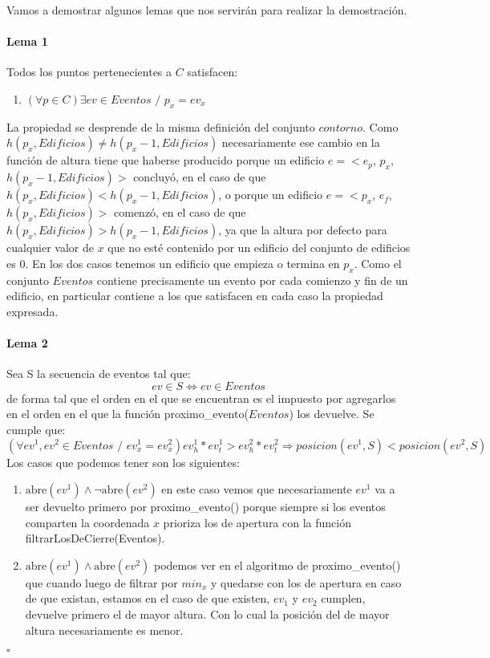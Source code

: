 Vamos a demostrar algunos lemas que nos servirán para realizar la demostración.

\paragraph{Lema 1}
Todos los puntos pertenecientes a $C$ satisfacen:
\begin{enumerate}
	\item $(\forall p \in C) \exists ev \in Eventos \text{ / } p_x = ev_x$
\end{enumerate}
La propiedad se desprende de la misma definición del conjunto $contorno$. Como $h(p_x, Edificios) \neq h(p_x - 1, Edificios)$ 
necesariamente ese cambio en la función de altura tiene que haberse producido porque un edificio 
$e = <e_p$, $p_x$, $h(p_x-1, Edificios)>$ concluyó, en el caso de que $h(p_x, Edificios) < h(p_x - 1, Edificios)$, o porque un
edificio $e = <p_x$, $e_f$, $h(p_x, Edificios)>$ comenzó, en el caso de que $h(p_x, Edificios) > h(p_x - 1, Edificios)$, ya que 
la altura por defecto para cualquier valor de $x$ que no esté contenido por un edificio del conjunto de edificios es 0. En los dos
casos tenemos un edificio que empieza o termina en $p_x$. Como el conjunto $Eventos$ contiene precisamente un evento por cada comienzo
y fin de un edificio, en particular contiene a los que satisfacen en cada caso la propiedad expresada.

\paragraph{Lema 2}
Sea S la secuencia de eventos tal que:
\begin{displaymath}
	ev \in S \Leftrightarrow ev \in Eventos
\end{displaymath}
de forma tal que el orden en el que se encuentran es el impuesto por agregarlos en el orden en el que la función 
proximo\_evento($Eventos$) los devuelve. Se cumple que:
\begin{displaymath}
	(\forall ev^1, ev^2 \in Eventos \text{ / } ev^1_x = ev^2_x) ev^1_h * ev^1_t > ev^2_h * ev^2_t \Rightarrow posicion(ev^1, S) < posicion(ev^2, S)
\end{displaymath}
Los casos que podemos tener son los siguientes:
\begin{enumerate}
	\item $\text{abre}(ev^1) \land \neg\text{abre}(ev^2)$  en este caso vemos que necesariamente $ev^1$ va a ser devuelto
	primero por proximo\_evento() porque siempre si los eventos comparten la coordenada $x$ prioriza los de apertura
	con la función filtrarLosDeCierre(Eventos).
	\item $\text{abre}(ev^1) \land \text{abre}(ev^2)$  podemos ver en el algoritmo de proximo\_evento() que cuando luego
	de filtrar por $min_x$ y quedarse con los de apertura en caso de que existan, estamos en el caso de que existen,
	$ev_1$ y $ev_2$ cumplen, devuelve primero el de mayor altura. Con lo cual la posición del de mayor altura
	necesariamente es menor.
\end{enumerate}
$\square$


